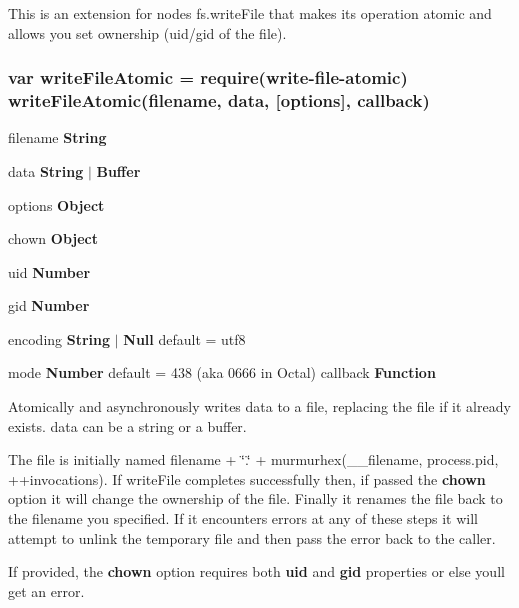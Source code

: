 This is an extension for node\textquotesingle{}s {\ttfamily fs.\+write\+File} that makes its operation atomic and allows you set ownership (uid/gid of the file).

\subsubsection*{var write\+File\+Atomic = require(\textquotesingle{}write-\/file-\/atomic\textquotesingle{})~\newline
write\+File\+Atomic(filename, data, \mbox{[}options\mbox{]}, callback)}


\begin{DoxyItemize}
\item filename {\bfseries String}
\item data {\bfseries String} $\vert$ {\bfseries Buffer}
\item options {\bfseries Object}
\begin{DoxyItemize}
\item chown {\bfseries Object}
\begin{DoxyItemize}
\item uid {\bfseries Number}
\item gid {\bfseries Number}
\end{DoxyItemize}
\item encoding {\bfseries String} $\vert$ {\bfseries Null} default = \textquotesingle{}utf8\textquotesingle{}
\item mode {\bfseries Number} default = 438 (aka 0666 in Octal) callback {\bfseries Function}
\end{DoxyItemize}
\end{DoxyItemize}

Atomically and asynchronously writes data to a file, replacing the file if it already exists. data can be a string or a buffer.

The file is initially named {\ttfamily filename + \char`\"{}.\char`\"{} + murmurhex(\+\_\+\+\_\+filename, process.\+pid, ++invocations)}. If write\+File completes successfully then, if passed the {\bfseries chown} option it will change the ownership of the file. Finally it renames the file back to the filename you specified. If it encounters errors at any of these steps it will attempt to unlink the temporary file and then pass the error back to the caller.

If provided, the {\bfseries chown} option requires both {\bfseries uid} and {\bfseries gid} properties or else you\textquotesingle{}ll get an error.


